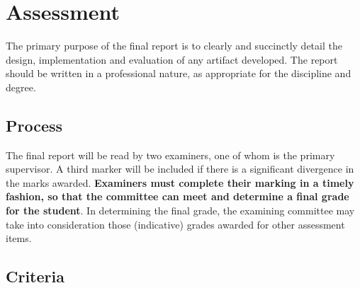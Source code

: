 \section{Assessment}
The primary purpose of the final report is to clearly and succinctly
detail the design, implementation and evaluation of any artifact
developed.  The report should be written in a professional nature, as
appropriate for the discipline and degree.

\subsection{Process}
The final report will be read by two examiners,
one of whom is the primary supervisor.  A third marker will be included 
if there is a significant divergence in the marks awarded.  {\bf
  Examiners must complete their marking in a timely fashion, so that
  the committee can meet and determine a final grade for the student}.
In determining the final grade, the examining committee may take into
consideration those (indicative) grades awarded for other assessment
items.

\subsection{Criteria}


